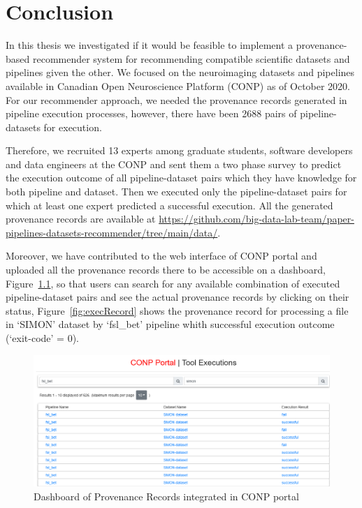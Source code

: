 \chapter{Conclusion}
\label{conclusion}

In this thesis we investigated if it would be feasible to implement a provenance-based recommender system for recommending compatible scientific datasets and pipelines given the other. We focused on the neuroimaging datasets and pipelines available in Canadian Open Neuroscience Platform (CONP) as of October 2020. For our recommender approach, we needed the provenance records generated in pipeline execution processes, however, there have been 2688 pairs of pipeline-datasets for execution. 

Therefore, we recruited 13 experts among graduate students, software developers and data engineers at the CONP and sent them a two phase survey to predict the execution outcome of all pipeline-dataset pairs which they have knowledge for both pipeline and dataset. Then we executed only the pipeline-dataset pairs for which at least one expert predicted a successful execution. All the generated provenance records are available at \url{https://github.com/big-data-lab-team/paper-pipelines-datasets-recommender/tree/main/data/}. 

Moreover, we have contributed to the web interface of CONP portal and uploaded all the provenance records there to be accessible on a dashboard, Figure~\ref{fig:dashProvenance}, so that users can search for any available combination of executed pipeline-dataset pairs and see the actual provenance records by clicking on their status, Figure~\ref{fig:execRecord} shows the provenance record for processing a file in `SIMON' dataset by `fsl\_bet' pipeline whith successful execution outcome (`exit-code' = 0).

\begin{figure}
    \centering
    \includegraphics[width=\textwidth,height=\textheight,keepaspectratio]{figures/executiondashboard.png}
    \caption{Dashboard of Provenance Records integrated in CONP portal}
    \label{fig:dashProvenance}
\end{figure}

